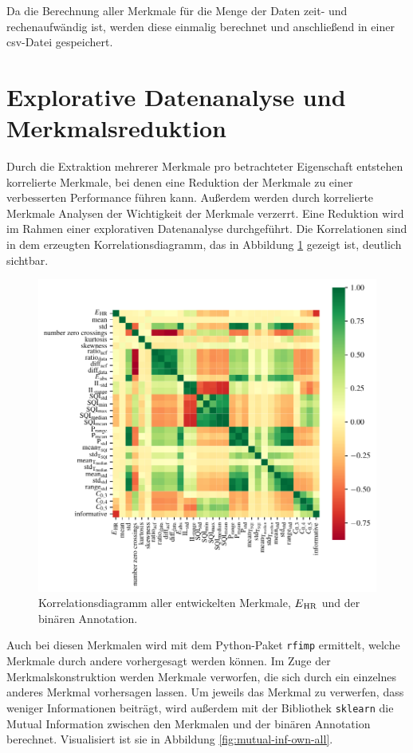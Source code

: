 Da die Berechnung aller Merkmale für die Menge der Daten zeit- und rechenaufwändig ist, werden diese einmalig berechnet und anschließend in einer csv-Datei gespeichert.

\section{Explorative Datenanalyse und Merkmalsreduktion}\label{reduction}

Durch die Extraktion mehrerer Merkmale pro betrachteter Eigenschaft entstehen korrelierte Merkmale, bei denen eine Reduktion der Merkmale zu einer verbesserten Performance führen kann. Außerdem werden durch korrelierte Merkmale Analysen der Wichtigkeit der Merkmale verzerrt. Eine Reduktion wird im Rahmen einer explorativen Datenanalyse durchgeführt. %
Die Korrelationen sind in dem erzeugten Korrelationsdiagramm, das in Abbildung \ref{fig:corr-heatmap-own} gezeigt ist, deutlich sichtbar.

\begin{figure}[H]
	\centering
	\includegraphics{pic/corr-heatmap-own.pdf}
	\caption{Korrelationsdiagramm aller entwickelten Merkmale, $E\textsubscript{HR}$ und der binären Annotation.}
	\label{fig:corr-heatmap-own}
\end{figure}
 
Auch bei diesen Merkmalen wird mit dem Python-Paket \texttt{rfimp} ermittelt, welche Merkmale durch andere vorhergesagt werden können. Im Zuge der Merkmalskonstruktion werden Merkmale verworfen, die sich durch ein einzelnes anderes Merkmal vorhersagen lassen. Um jeweils das Merkmal zu verwerfen, dass weniger Informationen beiträgt, wird außerdem mit der Bibliothek \texttt{sklearn} die Mutual Information zwischen den Merkmalen und der binären Annotation berechnet. Visualisiert ist sie in Abbildung \ref{fig:mutual-inf-own-all}.

